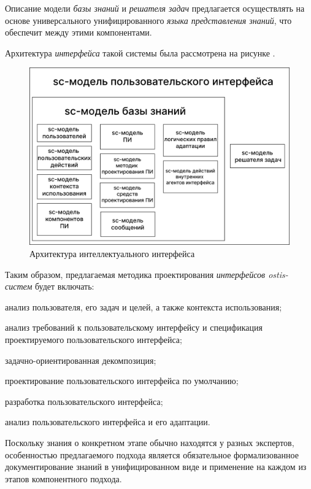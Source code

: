 Описание модели \textit{базы знаний} и \textit{решателя задач} предлагается осуществлять на основе универсального унифицированного \textit{языка представления знаний}, что обеспечит  между этими компонентами.

Архитектура \textit{интерфейса} такой системы была рассмотрена на рисунке .

\begin{figure}[h]
	\centering
	\includegraphics[scale=0.2]{images/part5/sc-model-ui.png}
	\caption{Архитектура интеллектуального интерфейса}
	\label{fig:archit_intel_system}
\end{figure}

Таким образом, предлагаемая методика проектирования \textit{интерфейсов ostis-систем} будет включать:
\begin{textitemize}
\item анализ пользователя, его задач и целей, а также контекста использования;
\item анализ требований к пользовательскому интерфейсу и спецификация проектируемого пользовательского интерфейса;
\item задачно-ориентированная декомпозиция;
\item проектирование пользовательского интерфейса по умолчанию;
\item разработка пользовательского интерфейса;
\item анализ пользовательского интерфейса и его адаптации.
\end{textitemize}

Поскольку знания о конкретном этапе обычно находятся у разных экспертов, особенностью предлагаемого подхода является обязательное формализованное документирование знаний в унифицированном виде и применение на каждом из этапов компонентного подхода.

